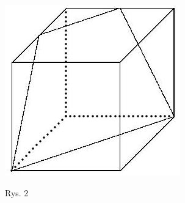 \documentclass[10pt]{article}
\begin{document}
\begin{enumerate}
\includegraphics[max width=\textwidth, center]{2024_11_21_80c827237e5b1a9f7989g-2}
\end{enumerate}

Rys. 2
\end{document}
